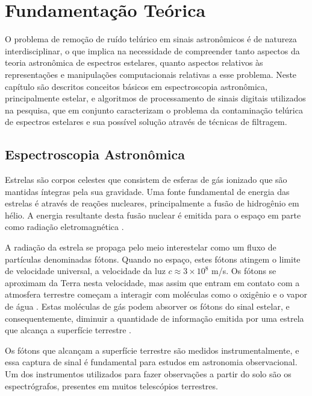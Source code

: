 \chapter{Fundamentação Teórica}
\label{cap:fundamentacao-teorica}

O problema de remoção de ruído telúrico em sinais astronômicos é de natureza interdisciplinar, o que implica na necessidade de compreender tanto aspectos da teoria astronômica de espectros estelares, quanto aspectos relativos às representações e manipulações computacionais relativas a esse problema.
Neste capítulo são descritos conceitos básicos em espectroscopia astronômica, principalmente estelar, e algoritmos de processamento de sinais digitais utilizados na pesquisa, que em conjunto caracterizam o problema da contaminação telúrica de espectros estelares e sua possível solução através de técnicas de filtragem.

\section{Espectroscopia Astronômica} \label{astronomic-spectroscopy}

Estrelas são corpos celestes que consistem de esferas de gás ionizado que são mantidas íntegras pela sua gravidade. Uma fonte fundamental de energia das estrelas é através de reações nucleares, principalmente a fusão de hidrogênio em hélio. A energia resultante desta fusão nuclear é emitida para o espaço em parte como radiação eletromagnética \citep{estrelas-ufrgs}.   

A radiação da estrela se propaga pelo meio interestelar como um fluxo de partículas denominadas fótons. Quando no espaço, estes fótons atingem o limite de velocidade universal, a velocidade da luz $\textit{c} \approx 3 \times 10^8$ m/s. Os fótons se aproximam da Terra nesta velocidade, mas assim que entram em contato com a atmosfera terrestre começam a interagir com moléculas como o oxigênio e o vapor de água \citep{wiki:photon}. Estas moléculas de gás podem absorver os fótons do sinal estelar, e consequentemente, diminuir a quantidade de informação emitida por uma estrela que alcança a superfície terrestre \citep{wiki:telluric-contamination}.

Os fótons que alcançam a superfície terrestre são medidos instrumentalmente, e essa captura de sinal é fundamental para estudos em astronomia observacional. Um dos instrumentos utilizados para fazer observações a partir do solo são os espectrógrafos, presentes em muitos telescópios terrestres. 

